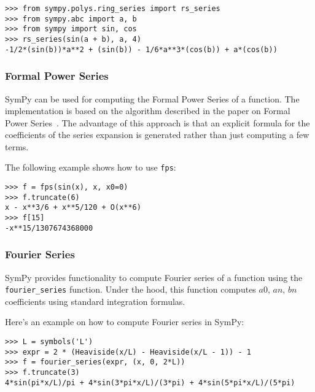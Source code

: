\begin{verbatim}
>>> from sympy.polys.ring_series import rs_series
>>> from sympy.abc import a, b
>>> from sympy import sin, cos
>>> rs_series(sin(a + b), a, 4)
-1/2*(sin(b))*a**2 + (sin(b)) - 1/6*a**3*(cos(b)) + a*(cos(b))
\end{verbatim}

\subsubsection{Formal Power Series}

SymPy can be used for computing the Formal Power Series of a function.
The implementation is based on the algorithm described in the paper on
Formal Power Series~\cite{Gruntz93formalpower}.  The advantage of this approach is
that an explicit formula for the coefficients of the series expansion is generated
rather than just computing a few terms.

The following example shows how to use \texttt{fps}:

\begin{verbatim}
>>> f = fps(sin(x), x, x0=0)
>>> f.truncate(6)
x - x**3/6 + x**5/120 + O(x**6)
>>> f[15]
-x**15/1307674368000
\end{verbatim}

\subsubsection{Fourier Series}

SymPy provides functionality to compute Fourier series of a function using the
\texttt{fourier\_series} function. Under the hood, this function computes $a0$,
$an$, $bn$ coefficients using standard integration formulas.

Here's an example on how to compute Fourier series in SymPy:

\begin{verbatim}
>>> L = symbols('L')
>>> expr = 2 * (Heaviside(x/L) - Heaviside(x/L - 1)) - 1
>>> f = fourier_series(expr, (x, 0, 2*L))
>>> f.truncate(3)
4*sin(pi*x/L)/pi + 4*sin(3*pi*x/L)/(3*pi) + 4*sin(5*pi*x/L)/(5*pi)
\end{verbatim}
